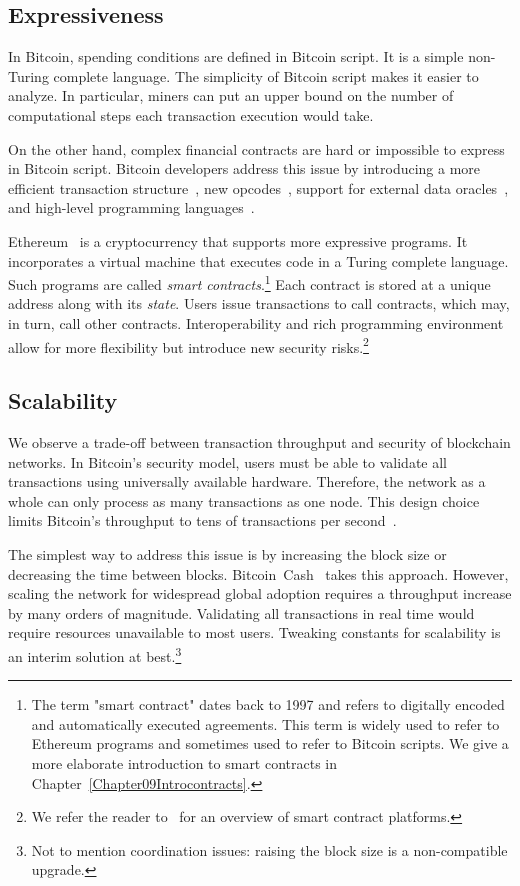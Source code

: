 \subsection{Expressiveness}

In Bitcoin, spending conditions are defined in Bitcoin script.
It is a simple non-Turing complete language.
The simplicity of Bitcoin script makes it easier to analyze.
In particular, miners can put an upper bound on the number of computational steps each transaction execution would take.

On the other hand, complex financial contracts are hard or impossible to express in Bitcoin script.
Bitcoin developers address this issue by introducing a more efficient transaction structure~\cite{Wuille2020}, new opcodes~\cite{Rubin2020}, support for external data oracles~\cite{Dryja}, and high-level programming languages~\cite{OConnor2017, Wuille2019}.

Ethereum~\cite{Buterin2014, Wood2014} is a cryptocurrency that supports more expressive programs.
It incorporates a virtual machine that executes code in a Turing complete language.
Such programs are called \textit{smart contracts}.\footnote{The term "smart contract" dates back to 1997 and refers to digitally encoded and automatically executed agreements. This term is widely used to refer to Ethereum programs and sometimes used to refer to Bitcoin scripts. We give a more elaborate introduction to smart contracts in Chapter~\ref{Chapter09Introcontracts}.}
Each contract is stored at a unique address along with its \textit{state}.
Users issue transactions to call contracts, which may, in turn, call other contracts.
Interoperability and rich programming environment allow for more flexibility but introduce new security risks.\footnote{We refer the reader to~\cite{Bartoletti2017} for an overview of smart contract platforms.}


\subsection{Scalability}

We observe a trade-off between transaction throughput and security of blockchain networks.
In Bitcoin's security model, users must be able to validate all transactions using universally available hardware.
Therefore, the network as a whole can only process as many transactions as one node.
This design choice limits Bitcoin's throughput to tens of transactions per second~\cite{Croman2016}.

The simplest way to address this issue is by increasing the block size or decreasing the time between blocks.
Bitcoin~Cash~\cite{Kwon2019} takes this approach.
However, scaling the network for widespread global adoption requires a throughput increase by many orders of magnitude.
Validating all transactions in real time would require resources unavailable to most users.
Tweaking constants for scalability is an interim solution at best.\footnote{Not to mention coordination issues: raising the block size is a non-compatible upgrade.}

